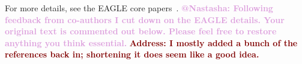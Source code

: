 \documentclass[fleqn,usenatbib]{mnras}
\makeatletter
\newcommand{\todo}[1]{\textcolor{Maroon}{\textbf{Address: #1}}}
\newcommand{\atnastasha}[1]{\textcolor{Plum}{\textbf{@Nastasha: #1}}}
\makeatother
\begin{document}
For more details, see the EAGLE core papers~\citep{Schaye2015,Crain2015,McAlpine2016}.
\atnastasha{Following feedback from co-authors I cut down on the EAGLE details. Your original text is commented out below. Please feel free to restore anything you think essential.}
\todo{I mostly added a bunch of the references back in; shortening it does seem like a good idea.}



\end{document}
